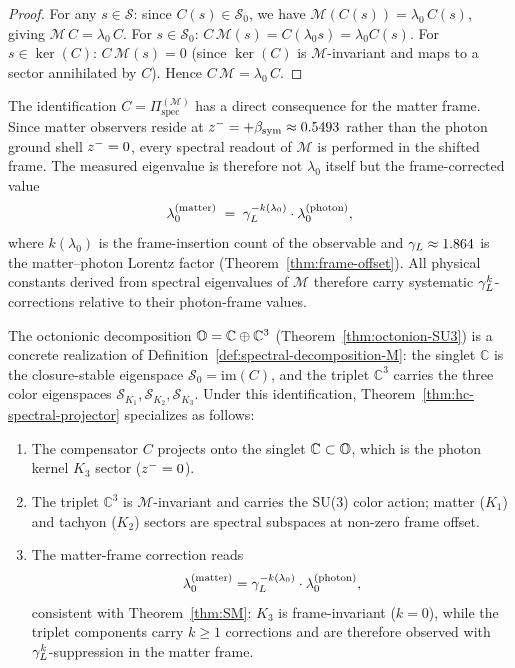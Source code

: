 \begin{proof}
For any $s\in\mathcal{S}$: since $C(s)\in\mathcal{S}_0$, we have
$\mathcal{M}(C(s))=\lambda_0\,C(s)$, giving $\mathcal{M}\,C=\lambda_0\,C$.
For $s\in\mathcal{S}_0$: $C\,\mathcal{M}(s)=C(\lambda_0 s)=\lambda_0 C(s)$.
For $s\in\ker(C)$: $C\,\mathcal{M}(s)=0$ (since $\ker(C)$ is
$\mathcal{M}$-invariant and maps to a sector annihilated by $C$).
Hence $C\,\mathcal{M}=\lambda_0\,C$.
\end{proof}

\begin{remark}
\label{rem:frame-shift-spectral}
The identification $C = \Pi^{(\mathcal{M})}_{\mathrm{spec}}$ has a direct
consequence for the matter frame. Since matter observers reside at
$z^- = +\beta_{\mathrm{sym}} \approx 0.5493$ rather than the photon ground shell
$z^- = 0$, every spectral readout of $\mathcal{M}$ is performed in the
shifted frame. The measured eigenvalue is therefore not $\lambda_0$ itself
but the frame-corrected value
\[
 \lambda_0^{(\mathrm{matter})}
 \;=\; \gamma_L^{-k(\lambda_0)}\cdot\lambda_0^{(\mathrm{photon})},
\]
where $k(\lambda_0)$ is the frame-insertion count of the observable and
$\gamma_L \approx 1.864$ is the matter--photon Lorentz factor
(Theorem~\ref{thm:frame-offset}). All physical constants derived from
spectral eigenvalues of $\mathcal{M}$ therefore carry systematic
$\gamma_L^k$-corrections relative to their photon-frame values.
\end{remark}

\begin{corollary}
\label{cor:SM-spectral-realization}
The octonionic decomposition $\mathbb{O} = \mathbb{C}\oplus\mathbb{C}^3$
(Theorem~\ref{thm:octonion-SU3}) is a concrete realization of
Definition~\ref{def:spectral-decomposition-M}: the singlet $\mathbb{C}$ is
the closure-stable eigenspace $\mathcal{S}_0 = \mathrm{im}(C)$, and the
triplet $\mathbb{C}^3$ carries the three color eigenspaces
$\mathcal{S}_{K_1},\mathcal{S}_{K_2},\mathcal{S}_{K_3}$.
Under this identification, Theorem~\ref{thm:hc-spectral-projector}
specializes as follows:
\begin{enumerate}[label=(\roman*)]
 \item The compensator $C$ projects onto the singlet $\mathbb{C}\subset\mathbb{O}$,
 which is the photon kernel $K_3$ sector ($z^-=0$).
 \item The triplet $\mathbb{C}^3$ is $\mathcal{M}$-invariant and carries
 the SU(3) color action; matter ($K_1$) and tachyon ($K_2$) sectors are
 spectral subspaces at non-zero frame offset.
 \item The matter-frame correction reads
 \[
 \lambda_0^{(\mathrm{matter})}
 = \gamma_L^{-k(\lambda_0)}\cdot\lambda_0^{(\mathrm{photon})},
 \]
 consistent with Theorem~\ref{thm:SM}: $K_3$ is frame-invariant
 ($k=0$), while the triplet components carry $k\ge 1$ corrections
 and are therefore observed with $\gamma_L^k$-suppression in the matter frame.
\end{enumerate}
\end{corollary}

